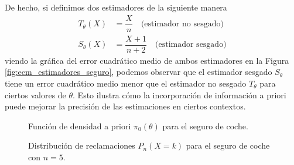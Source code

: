 \begin{ejemplo}
    \noindent
    De hecho, si definimos dos estimadores de la siguiente manera 
    \begin{align*}
        T_{\theta}(X) &= \dfrac{X}{n} \quad \text{(estimador no sesgado)} \\
        S_{\theta}(X) &= \dfrac{X+1}{n+2} \quad \text{(estimador sesgado)}
    \end{align*}
    viendo la gráfica del error cuadrático medio de ambos estimadores en la Figura \ref{fig:ecm_estimadores_seguro}, podemos observar que el estimador sesgado $S_{\theta}$ tiene un error cuadrático medio menor que el estimador no sesgado $T_{\theta}$ para ciertos valores de $\theta$. Esto ilustra cómo la incorporación de información a priori puede mejorar la precisión de las estimaciones en ciertos contextos.
\end{ejemplo}

\begin{figure}
    \centering
    \caption{Función de densidad a priori $\pi_0(\theta)$ para el seguro de coche.}
    \label{fig:densidad_apriori_seguro}
\end{figure}

\begin{figure}
    \centering
    \caption{Distribución de reclamaciones $P_n(X=k)$ para el seguro de coche con $n=5$.}
    \label{fig:distribucion_reclamaciones_seguro}
\end{figure}

